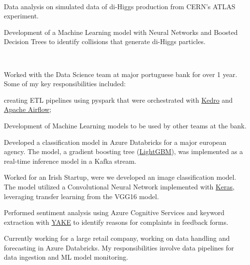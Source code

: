 \documentclass[a4paper]{MagicalCV}
\begin{document}
\hfill
\begin{minipage}[t]{0.66\textwidth} 


 \\
\vspace{\topsep} %
\begin{tightemize}
    \item Data analysis on simulated data of di-Higgs production from CERN's ATLAS experiment.
    \item Development of a Machine Learning model with Neural Networks and Boosted Decision Trees to identify collisions that generate di-Higgs particles.
\end{tightemize}
\sectionsep

 \\
\vspace{\topsep} %
\begin{tightemize}
    \item Worked with the Data Science team at major portuguese bank for over 1 year. Some of my key responsibilities included:
    \begin{tightemize}
        \item  creating ETL pipelines using pyspark that were orchestrated with \href{https://kedro.readthedocs.io/en/stable/index.html}{Kedro} and \href{https://airflow.apache.org}{Apache Airflow};
        \item Development of Machine Learning models to be used by other teams at the bank.
    \end{tightemize}
    \item Developed a classification model in Azure Databricks for a major european agency. The model, a gradient boosting tree (\href{https://lightgbm.readthedocs.io/en/latest/}{LightGBM}), was implemented as a real-time inference model in a Kafka stream.
    \item Worked for an Irish Startup, were we developed an image classification model. The model utilized a Convolutional Neural Network implemented with \href{https://keras.io/}{Keras}, leveraging transfer learning from the VGG16 model.
    \item Performed sentiment analysis using Azure Cognitive Services and keyword extraction with \href{http://yake.inesctec.pt/}{YAKE} to identify reasons for complaints in feedback forms.
    \item Currently working for a large retail company, working on data handling and forecasting in Azure Databricks. My responsibilities involve data pipelines for data ingestion and ML model monitoring.
\end{tightemize}
\sectionsep


\end{minipage}
\end{document}
